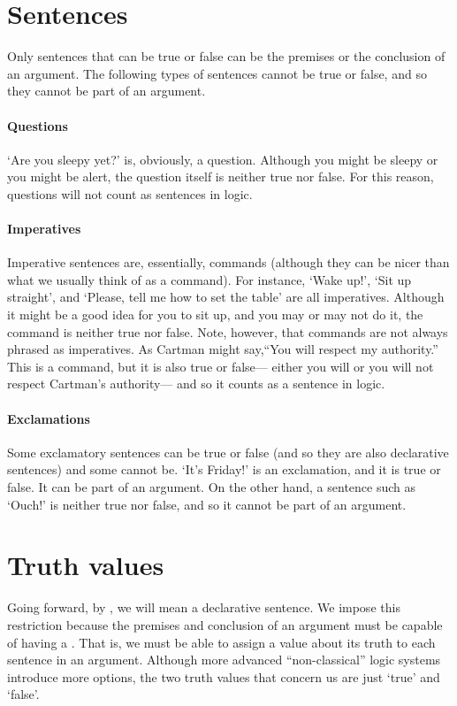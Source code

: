 \section{Sentences}
\label{intro.sentences}

Only sentences that can be true or false can be the premises or the conclusion of an argument. The following types of sentences cannot be true or false, and so they cannot be part of an argument.

\paragraph{Questions} `Are you sleepy yet?' is, obviously, a question. Although you might be sleepy or you might be alert, the question itself is neither true nor false. For this reason, questions will not count as sentences in logic. 

\paragraph{Imperatives} Imperative sentences are, essentially, commands (although they can be nicer than what we usually think of as a command). For instance, `Wake up!', `Sit up straight', and `Please, tell me how to set the table' are all imperatives. Although it might be a good idea for you to sit up, and you may or may not do it, the command is neither true nor false. Note, however, that commands are not always phrased as imperatives.  As Cartman might say,``You will respect my authority.'' This is a command, but it is also true or false--- either you will or you will not respect Cartman's authority--- and so it counts as a sentence in logic.

\paragraph{Exclamations} Some exclamatory sentences can be true or false (and so they are also declarative sentences) and some cannot be. `It's Friday!' is an exclamation, and it is true or false. It can be part of an argument. On the other hand, a sentence such as `Ouch!' is neither true nor false, and so it cannot be part of an argument. 

\section{Truth values}
Going forward, by , we will mean a declarative sentence. We impose this restriction because the premises and conclusion of an argument must be capable of having a . That is, we must be able to assign a value about its truth to each sentence in an argument. Although more advanced ``non-classical'' logic systems introduce more options, the two truth values that concern us are just `true' and `false'. 

